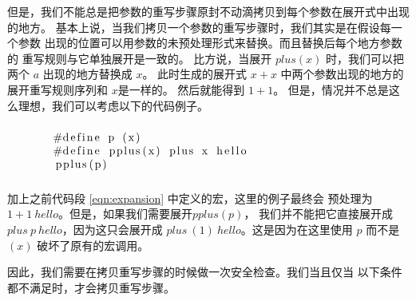 
但是，我们不能总是把参数的重写步骤原封不动滴拷贝到每个参数在展开式中出现的地方。
基本上说，当我们拷贝一个参数的重写步骤时，我们其实是在假设每一个参数
出现的位置可以用参数的未预处理形式来替换。而且替换后每个地方参数的
重写规则与它单独展开是一致的。
比方说，当展开 $plus(x)$ 时，我们可以把两个 $a$ 出现的地方替换成 $x$。
此时生成的展开式 $x+x$ 中两个参数出现的地方的展开重写规则序列和 $x$是一样的。
然后就能得到 $1+1$。
但是，情况并不总是这么理想，我们可以考虑以下的代码例子。

\begin{equation}\label{eqn:expandToParentheses}
  \begin{minipage}{0.8\columnwidth}
\begin{lstlisting}
#define p (x)
#define pplus(x) plus x hello
pplus(p)  
\end{lstlisting}
    \end{minipage}
\end{equation}

加上之前代码段 \ref{eqn:expansion} 中定义的宏，这里的例子最终会
预处理为$1+1\ hello$。但是，如果我们需要展开$pplus(p)$，
我们并不能把它直接展开成$plus\ p\ hello$，因为这只会展开成
$plus\ (1)\ hello$。这是因为在这里使用 $p$ 而不是 $(x)$ 
破坏了原有的宏调用。


因此，我们需要在拷贝重写步骤的时候做一次安全检查。我们当且仅当
以下条件都不满足时，才会拷贝重写步骤。

